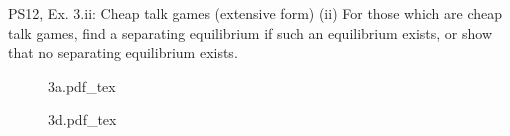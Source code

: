 \begin{frame}{PS12, Ex. 3.ii: Cheap talk games (extensive form)}
    (ii) For those which are cheap talk games, find a separating equilibrium if such an equilibrium exists, or show that no separating equilibrium exists.\vspace{-6pt}
    \begin{multicols}{2}
      \begin{figure}[!h]
        \center{}
        {3a.pdf_tex}
      \end{figure}
      \vfill\null\columnbreak
      \vfill\null\vspace{85pt}
      \begin{figure}[!h]
        \center{}
        {3d.pdf_tex}
      \end{figure}
    \end{multicols}
\end{frame}

